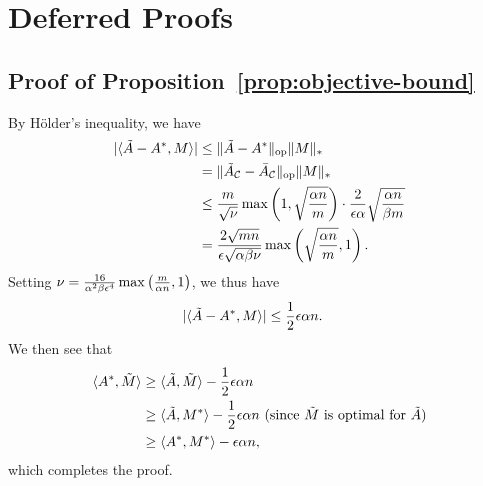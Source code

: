 \section{Deferred Proofs}
\label{sec:proofs}

\subsection{Proof of Proposition~\ref{prop:objective-bound}}
\label{sec:objective-bound-proof}

By H\"{o}lder's inequality, we have 
\begin{align}
|\langle \A-\Aa, M \rangle| &\leq \|\A-\Aa\|_{\op}\|M\|_* \\
 &= \|\A_{\sC}-\Aavg_{\sC}\|_{\op}\|M\|_* \\
 &\leq \frac{m}{\sqrt{\fac}}\max\p{1, \sqrt{\frac{\alpha n}{m}}} \cdot \frac{2}{\epsilon\alpha}\sqrt{\frac{\alpha n}{\beta m}} \\
 &= \frac{2\sqrt{mn}}{\epsilon\sqrt{\alpha\beta\fac}}\max\p{\sqrt{\frac{\alpha n}{m}}, 1}. %
\end{align}
Setting $\nu = \frac{16}{\alpha^2\beta\epsilon^4}\max\left( \frac{m}{\alpha n}, 1 \right)$, 
we thus have
\begin{align}
|\langle \tilde{A}-A^*, M \rangle| &\leq \frac{1}{2}\epsilon \alpha n.
\end{align}
We then see that
\begin{align}
\langle A^*, \tilde{M} \rangle  &\geq \langle \tilde{A}, \tilde{M} \rangle - \frac{1}{2}\epsilon \alpha n \\
 &\geq \langle \tilde{A}, M^* \rangle - \frac{1}{2} \epsilon \alpha n \text{ (since $\tilde{M}$ is optimal for $\tilde{A}$)} \\
 &\geq \langle A^*, M^* \rangle - \epsilon \alpha n,
\end{align}
which completes the proof.


